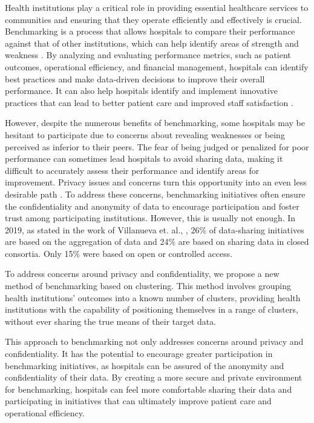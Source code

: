 Health institutions play a critical role in providing essential healthcare services to communities and ensuring that they operate efficiently and effectively is crucial. Benchmarking is a process that allows hospitals to compare their performance against that of other institutions, which can help identify areas of strength and weakness \cite{suydamPatientSafetyData2007}. By analyzing and evaluating performance metrics, such as patient outcomes, operational efficiency, and financial management, hospitals can identify best practices and make data-driven decisions to improve their overall performance. It can also help hospitals identify and implement innovative practices that can lead to better patient care and improved staff satisfaction \cite{hulsenSharingCaringData2020}.

However, despite the numerous benefits of benchmarking, some hospitals may be hesitant to participate due to concerns about revealing weaknesses or being perceived as inferior to their peers.  The fear of being judged or penalized for poor performance can sometimes lead hospitals to avoid sharing data, making it difficult to accurately assess their performance and identify areas for improvement. Privacy issues and concerns turn this opportunity into an even less desirable path \cite{hulsenSharingCaringData2020}. To address these concerns, benchmarking initiatives often ensure the confidentiality and anonymity of data to encourage participation and foster trust among participating institutions. However, this is usually not enough.  In 2019, as stated in the work of Villanueva et. al., \cite{villanuevaCharacterizingBiomedicalDataSharing2019}, 26\% of data-sharing initiatives are based on the aggregation of data and 24\% are based on sharing data in closed consortia. Only 15\% were based on open or controlled access.

To address concerns around privacy and confidentiality, we propose a new method of benchmarking based on clustering. This method involves grouping health institutions' outcomes into a known number of clusters, providing health institutions with the capability of positioning themselves in a range of clusters, without ever sharing the true means of their target data.

This approach to benchmarking not only addresses concerns around privacy and confidentiality. It has the potential to encourage greater participation in benchmarking initiatives, as hospitals can be assured of the anonymity and confidentiality of their data. By creating a more secure and private environment for benchmarking, hospitals can feel more comfortable sharing their data and participating in initiatives that can ultimately improve patient care and operational efficiency.

